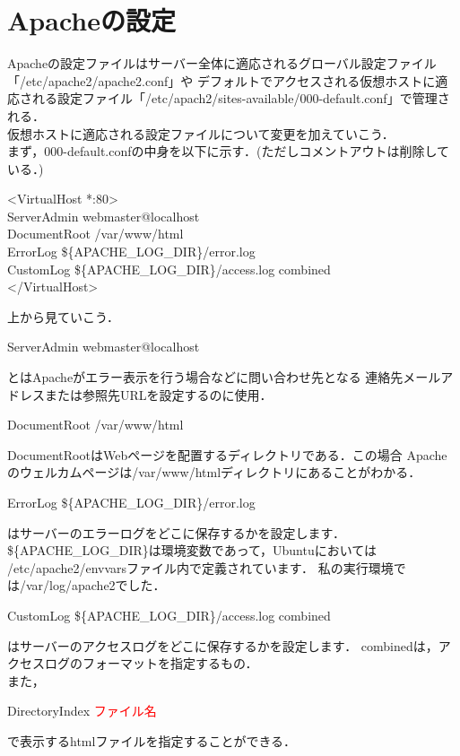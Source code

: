 \documentclass[dvipdfmx,a4paper,11pt]{jsbook}
\begin{document}
\section{Apacheの設定}
Apacheの設定ファイルはサーバー全体に適応されるグローバル設定ファイル「/etc/apache2/apache2.conf」や
デフォルトでアクセスされる仮想ホストに適応される設定ファイル「/etc/apach2/sites-available/000-default.conf」で管理される．\\
仮想ホストに適応される設定ファイルについて変更を加えていこう．\\
まず，000-default.confの中身を以下に示す．(ただしコメントアウトは削除している．)
\begin{tcolorbox}[terminalbox]
  <VirtualHost *:80>\\
  \qquad ServerAdmin webmaster@localhost\\
  \qquad  DocumentRoot /var/www/html\\
  \qquad  ErrorLog \$\{APACHE\_LOG\_DIR\}/error.log\\
  \qquad  CustomLog \$\{APACHE\_LOG\_DIR\}/access.log combined\\
  </VirtualHost>
\end{tcolorbox}
上から見ていこう．
\begin{tcolorbox}[terminalbox]
  ServerAdmin webmaster@localhost
\end{tcolorbox}
とはApacheがエラー表示を行う場合などに問い合わせ先となる
連絡先メールアドレスまたは参照先URLを設定するのに使用．
\begin{tcolorbox}[terminalbox]
  DocumentRoot /var/www/html
\end{tcolorbox}
DocumentRootはWebページを配置するディレクトリである．この場合
Apacheのウェルカムページは/var/www/htmlディレクトリにあることがわかる．
\begin{tcolorbox}[terminalbox]
  ErrorLog \$\{APACHE\_LOG\_DIR\}/error.log
\end{tcolorbox}
はサーバーのエラーログをどこに保存するかを設定します．
\$\{APACHE\_LOG\_DIR\}は環境変数であって，Ubuntuにおいては
/etc/apache2/envvarsファイル内で定義されています．
私の実行環境では/var/log/apache2でした．
\begin{tcolorbox}[terminalbox]
  CustomLog \$\{APACHE\_LOG\_DIR\}/access.log combined
\end{tcolorbox}
はサーバーのアクセスログをどこに保存するかを設定します．
combinedは，アクセスログのフォーマットを指定するもの．\\
また，
\begin{tcolorbox}[terminalbox]
  DirectoryIndex \textcolor{red}{ファイル名}
\end{tcolorbox}
で表示するhtmlファイルを指定することができる．
\end{document}
